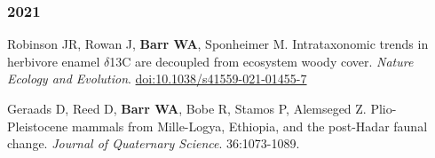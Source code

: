 







\subsubsection*{2021}

\item Robinson JR, Rowan J,  {\bfseries Barr WA}, Sponheimer M. Intrataxonomic trends in herbivore enamel $\delta$13C are decoupled from ecosystem woody cover.  \emph{Nature Ecology and Evolution}. \href{https://dx.doi.org/10.1038/s41559-021-01455-7}{doi:10.1038/s41559-021-01455-7}

\item Geraads D, Reed D, {\bfseries Barr WA}, Bobe R, Stamos P, Alemseged Z. Plio-Pleistocene mammals from Mille-Logya, Ethiopia, and the post-Hadar faunal change. \emph{Journal of Quaternary Science}. 36:1073-1089.

